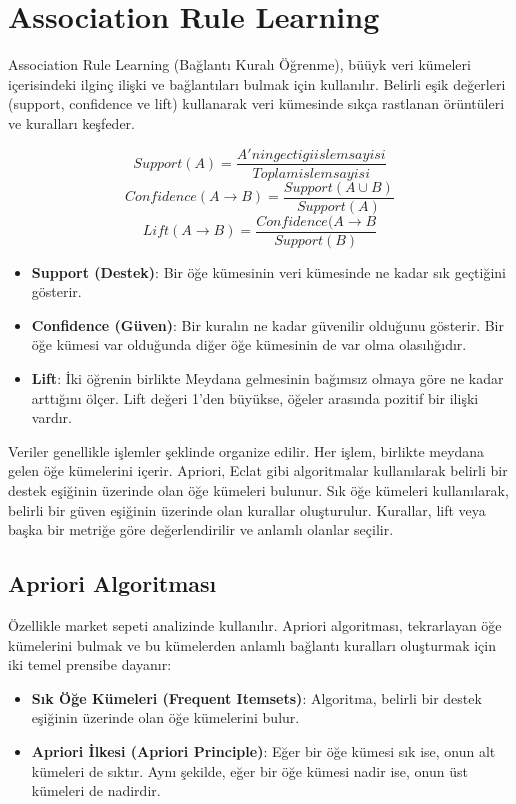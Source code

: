 \section{Association Rule Learning}

Association Rule Learning (Bağlantı Kuralı Öğrenme), büüyk veri kümeleri içerisindeki ilginç ilişki ve bağlantıları bulmak için kullanılır. Belirli eşik değerleri  (support, confidence ve lift) kullanarak veri kümesinde sıkça rastlanan örüntüleri ve kuralları keşfeder.

\[ Support(A) = \frac{A'nin gectigi islem sayisi}{Toplam islem sayisi} \]
\[ Confidence(A \rightarrow B) = \frac{Support(A \cup B)}{Support(A)} \]
\[ Lift(A \rightarrow B) = \frac{Confidence(A \rightarrow B}{Support(B)} \]

\begin{itemize}
	\item \textbf{Support (Destek)}: Bir öğe kümesinin veri kümesinde ne kadar sık geçtiğini gösterir.
	\item \textbf{Confidence (Güven)}: Bir kuralın ne kadar güvenilir olduğunu gösterir. Bir öğe kümesi var olduğunda diğer öğe kümesinin de var olma olasılığıdır.
	\item \textbf{Lift}: İki öğrenin birlikte Meydana gelmesinin bağımsız olmaya göre ne kadar arttığını ölçer. Lift değeri 1'den büyükse, öğeler arasında pozitif bir ilişki vardır.
\end{itemize}

Veriler genellikle işlemler şeklinde organize edilir. Her işlem, birlikte meydana gelen öğe kümelerini içerir. Apriori, Eclat gibi algoritmalar kullanılarak belirli bir destek eşiğinin üzerinde olan öğe kümeleri bulunur. Sık öğe kümeleri kullanılarak, belirli bir güven eşiğinin üzerinde olan kurallar oluşturulur. Kurallar, lift veya başka bir metriğe göre değerlendirilir ve anlamlı olanlar seçilir.

\subsection{Apriori Algoritması}
Özellikle market sepeti analizinde kullanılır. Apriori algoritması, tekrarlayan öğe kümelerini bulmak ve bu kümelerden anlamlı bağlantı kuralları oluşturmak için iki temel prensibe dayanır:

\begin{itemize}
	\item \textbf{Sık Öğe Kümeleri (Frequent Itemsets)}: Algoritma, belirli bir destek eşiğinin üzerinde olan öğe kümelerini bulur.
	\item \textbf {Apriori İlkesi (Apriori Principle)}: Eğer bir öğe kümesi sık ise, onun alt kümeleri de sıktır. Aynı şekilde, eğer bir öğe kümesi nadir ise, onun üst kümeleri de nadirdir.
\end{itemize}

